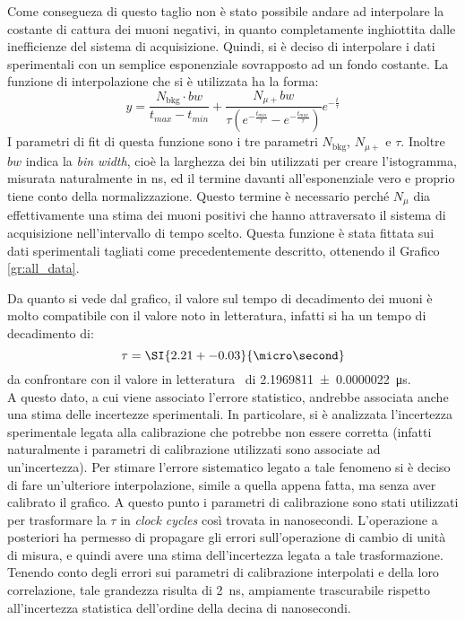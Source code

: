 Come consegueza di questo taglio non è stato possibile andare ad interpolare la costante di cattura dei muoni negativi, in quanto completamente inghiottita dalle inefficienze del sistema di acquisizione. 
Quindi, si è deciso di interpolare i dati sperimentali con un semplice esponenziale sovrapposto ad un fondo costante. La funzione di interpolazione che si è utilizzata ha la forma:
\begin{equation}
  y = \frac{N_\text{bkg} \cdot bw}{t_\textit{max}-t_\textit{min}}+\frac{N_{\mu+}bw}{\tau \left(e^{-\frac{t_\textit{min}}{\tau}} - e^{-\frac{t_\textit{max}}{\tau}}\right)}
  e^{-\frac{t}{\tau}} 
  \label{eq:fit_mean_life}
\end{equation}
I parametri di fit di questa funzione sono i tre parametri $N_\text{bkg}$, $N_{\mu+}$ e $\tau$. 
Inoltre $bw$ indica la \textit{bin width}, cioè la larghezza dei bin utilizzati per creare l'istogramma, misurata naturalmente in ns, ed il termine davanti all'esponenziale vero e proprio tiene conto della normalizzazione. 
Questo termine è necessario perché $N_\mu$ dia effettivamente una stima dei muoni positivi che hanno attraversato il sistema di acquisizione nell'intervallo di tempo scelto. Questa funzione è stata fittata sui dati sperimentali tagliati come precedentemente descritto, ottenendo il Grafico \ref{gr:all_data}.\\

Da quanto si vede dal grafico, il valore sul tempo di decadimento dei muoni è molto compatibile con il valore noto in  letteratura, infatti si ha un tempo di decadimento di:
\begin{equation}
  \tau = \SI{2.21+-0.03}{\micro\second}
\end{equation}
da confrontare con il valore in letteratura~\cite{bib:Patrignani:2016xqp} di \SI{2.1969811+-0.0000022}{\micro\second}.\\

A questo dato, a cui viene associato l'errore statistico, andrebbe associata anche una stima delle incertezze sperimentali. 
In particolare, si è analizzata l'incertezza sperimentale legata alla calibrazione che potrebbe non essere corretta (infatti naturalmente i parametri di calibrazione utilizzati sono associate ad un'incertezza). 
Per  stimare l'errore sistematico legato a tale fenomeno si è deciso di fare un'ulteriore interpolazione, simile a quella appena fatta, ma senza aver calibrato il  grafico. 
A questo punto i parametri di calibrazione sono stati utilizzati per trasformare la $\tau$ in \textit{clock cycles} così trovata in nanosecondi. 
L'operazione a posteriori ha permesso di propagare gli errori sull'operazione di cambio di unità di misura, e quindi avere una stima dell'incertezza legata a tale trasformazione.
Tenendo conto degli errori sui parametri di calibrazione interpolati e della loro correlazione, tale grandezza risulta di \SI{2}{\ns}, ampiamente trascurabile rispetto all'incertezza statistica dell'ordine della decina di nanosecondi.

